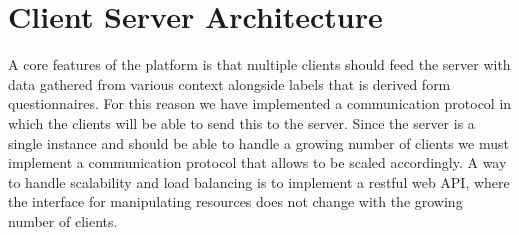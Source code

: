 
\chapter{Client Server Architecture}

A core features of the platform is that multiple clients should feed the server with data gathered from various context alongside labels that is derived form questionnaires. For this reason we have implemented a communication protocol in which the clients will be able to send this to the server. Since the server is a single instance and should be able to handle a growing number of clients we must implement a communication protocol that allows to be scaled accordingly. A way to handle scalability and load balancing is to implement a restful web API, where the interface for manipulating resources does not change with the growing number of clients.






